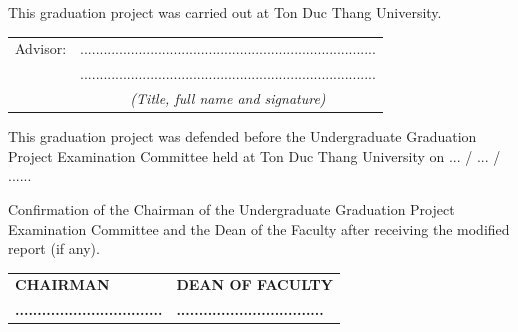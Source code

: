 \clearpage
\pagestyle{empty}
\thispagestyle{empty}
\vspace*{1cm}

{\setlength{\parindent}{0pt}
\noindent This graduation project was carried out at Ton Duc Thang University.

\vspace{0.2cm}
\noindent
\begin{tabular}{@{}p{2.5cm}c@{}}
Advisor: & ............................................................................ \\
         & ............................................................................ \\
         & \textit{(Title, full name and signature)}
\end{tabular}

\vspace{0.9cm}
\noindent This graduation project was defended before the Undergraduate Graduation Project Examination Committee held at Ton Duc Thang University on ... / ... / ......

\vspace{0.9cm}
\noindent Confirmation of the Chairman of the Undergraduate Graduation Project Examination Committee and the Dean of the Faculty after receiving the modified report (if any).

\vspace{1.2cm}
\noindent
\begin{tabular}{@{}p{}@{}p{}@{}}
\centering\textbf{CHAIRMAN} & \centering\arraybackslash\textbf{DEAN OF FACULTY} \\[2.4cm]
\centering\textbf{.................................} & \centering\arraybackslash\textbf{.................................}
\end{tabular}
\par}

\clearpage
